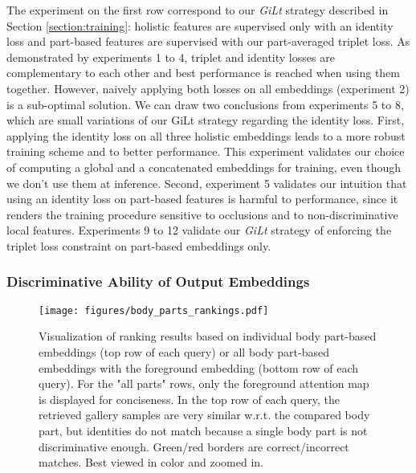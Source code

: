 \documentclass[10pt,twocolumn,letterpaper]{article}
\begin{document}
The experiment on the first row correspond to our \textit{GiLt} strategy described in Section \ref{section:training}: holistic features are supervised only with an identity loss and part-based features are supervised with our part-averaged triplet loss.
As demonstrated by experiments 1 to 4, triplet and identity losses are complementary to each other and best performance is reached when using them together. 
However, naively applying both losses on all embeddings (experiment 2) is a sub-optimal solution.
We can draw two conclusions from experiments 5 to 8, which are small variations of our GiLt strategy regarding the identity loss. 
First, applying the identity loss on all three holistic embeddings leads to a more robust training scheme and to better performance.
This experiment validates our choice of computing a global and a concatenated embeddings for training, even though we don't use them at inference.
Second, experiment 5 validates our intuition that using an identity loss on part-based features is harmful to performance, since it renders the training procedure sensitive to occlusions and to non-discriminative local features.
Experiments 9 to 12 validate our \textit{GiLt} strategy of enforcing the triplet loss constraint on part-based embeddings only.
















\subsubsection{Discriminative Ability of Output Embeddings} \label{section:test_embeddings}

\begin{figure}
\begin{center}
\texttt{[image: figures/body\_parts\_rankings.pdf]}
\end{center}
  \caption{
    Visualization of ranking results based on individual body part-based embeddings (top row of each query) or all body part-based embeddings with the foreground embedding (bottom row of each query). 
  For the "all parts" rows, only the foreground attention map is displayed for conciseness. 
In the top row of each query, the retrieved gallery samples are very similar w.r.t. the compared body part, but identities do not match because a single body part is not discriminative enough. 
Green/red borders are correct/incorrect matches. Best viewed in color and zoomed in.
  }
\label{fig:body_parts_rankings}
\end{figure}
\end{document}

